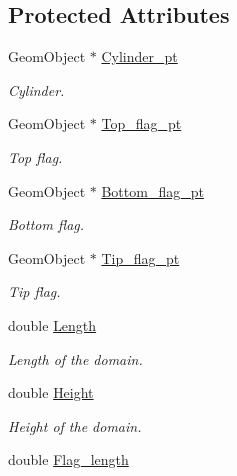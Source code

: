 \subsection*{Protected Attributes}
\begin{DoxyCompactItemize}
\item 
Geom\+Object $\ast$ \hyperlink{classoomph_1_1AlgebraicCylinderWithFlagMesh_a423d4aa7ffcca5e707b2e5d820984957}{Cylinder\+\_\+pt}
\begin{DoxyCompactList}\small\item\em Cylinder. \end{DoxyCompactList}\item 
Geom\+Object $\ast$ \hyperlink{classoomph_1_1AlgebraicCylinderWithFlagMesh_a326e4789fe96b3052a8beb51ec9e94d0}{Top\+\_\+flag\+\_\+pt}
\begin{DoxyCompactList}\small\item\em Top flag. \end{DoxyCompactList}\item 
Geom\+Object $\ast$ \hyperlink{classoomph_1_1AlgebraicCylinderWithFlagMesh_ac1f7e1ba183ba813229302c5688ea1ba}{Bottom\+\_\+flag\+\_\+pt}
\begin{DoxyCompactList}\small\item\em Bottom flag. \end{DoxyCompactList}\item 
Geom\+Object $\ast$ \hyperlink{classoomph_1_1AlgebraicCylinderWithFlagMesh_ad22c8bfa595f4b1f129be85a1904762f}{Tip\+\_\+flag\+\_\+pt}
\begin{DoxyCompactList}\small\item\em Tip flag. \end{DoxyCompactList}\item 
double \hyperlink{classoomph_1_1AlgebraicCylinderWithFlagMesh_a7620fa5a4c36f638fb22c81b346b74a2}{Length}
\begin{DoxyCompactList}\small\item\em Length of the domain. \end{DoxyCompactList}\item 
double \hyperlink{classoomph_1_1AlgebraicCylinderWithFlagMesh_a29a0c970a11d46bdf03f3b5053d3ece2}{Height}
\begin{DoxyCompactList}\small\item\em Height of the domain. \end{DoxyCompactList}\item 
double \hyperlink{classoomph_1_1AlgebraicCylinderWithFlagMesh_a822ed90585320576084667f88c236396}{Flag\+\_\+length}

\end{DoxyCompactItemize}
